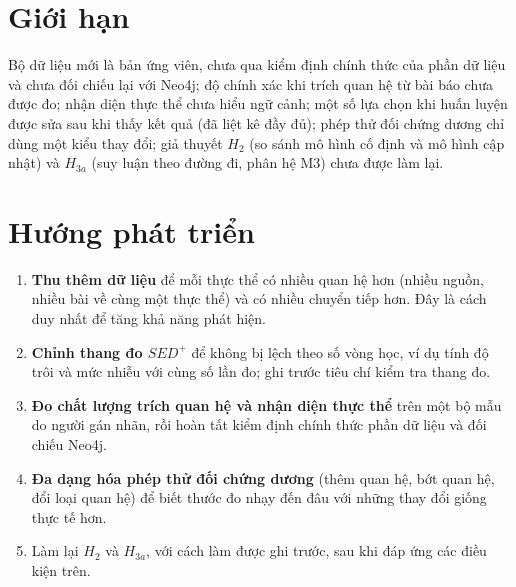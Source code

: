 \section{Giới hạn}
\label{sec:limitations}
Bộ dữ liệu mới là bản ứng viên, chưa qua kiểm định chính thức của phần dữ liệu và chưa đối chiếu lại với Neo4j; độ chính xác khi trích quan hệ từ bài báo chưa được đo; nhận diện thực thể chưa hiểu ngữ cảnh; một số lựa chọn khi huấn luyện được sửa sau khi thấy kết quả (đã liệt kê đầy đủ); phép thử đối chứng dương chỉ dùng một kiểu thay đổi; giả thuyết $H_2$ (so sánh mô hình cố định và mô hình cập nhật) và $H_{3a}$ (suy luận theo đường đi, phân hệ M3) chưa được làm lại.

\section{Hướng phát triển}
\label{sec:future}
\begin{enumerate}
    \item \textbf{Thu thêm dữ liệu} để mỗi thực thể có nhiều quan hệ hơn (nhiều nguồn, nhiều bài về cùng một thực thể) và có nhiều chuyển tiếp hơn. Đây là cách duy nhất để tăng khả năng phát hiện.
    \item \textbf{Chỉnh thang đo $SED^+$} để không bị lệch theo số vòng học, ví dụ tính độ trôi và mức nhiễu với cùng số lần đo; ghi trước tiêu chí kiểm tra thang đo.
    \item \textbf{Đo chất lượng trích quan hệ và nhận diện thực thể} trên một bộ mẫu do người gán nhãn, rồi hoàn tất kiểm định chính thức phần dữ liệu và đối chiếu Neo4j.
    \item \textbf{Đa dạng hóa phép thử đối chứng dương} (thêm quan hệ, bớt quan hệ, đổi loại quan hệ) để biết thước đo nhạy đến đâu với những thay đổi giống thực tế hơn.
    \item Làm lại $H_2$ và $H_{3a}$, với cách làm được ghi trước, sau khi đáp ứng các điều kiện trên.
\end{enumerate}
